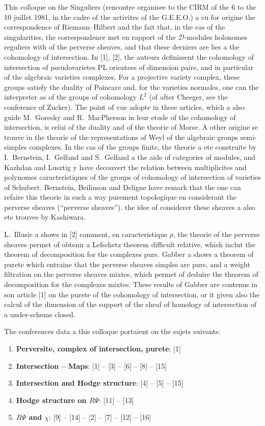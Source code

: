 \documentclass[12pt,a4paper]{article}
\theoremstyle{plain}
\theoremstyle{definition}
\theoremstyle{remark}
\newcommand{\cD}{\mathcal{D}}
\begin{document}
This colloque on the Singuliers (rencontre organisee to the CIRM of the 6 to the 10 juillet 1981, in the cadre of the activites of the G.E.E.O.) a eu for origine the correspondence of Riemann--Hilbert and the fait that, in the cas of the singularities, the correspondence met en rapport of the $\cD$-modules holonomes reguliers with of the perverse sheaves, and that these derniers are lies a the cohomology of intersection. In [1], [2], the auteurs definissent the cohomology of intersection of pseudovarietes PL orientees of dimension paire, and in particular of the algebraic varieties complexes. For a projective variety complex, these groups satisfy the duality of Poincare and, for the varieties normales, one can the interpreter as of the groups of cohomology $L^{2}$ (of after Cheeger, see the conference of Zucker). The point of vue adopte in these articles, which a also guide M.~Goresky and R.~MacPherson in leur etude of the cohomology of intersection, is celui of the duality and of the theorie of Morse. A other origine se trouve in the theorie of the representations of Weyl of the algebraic groups semi-simples complexes. In the cas of the groups finite, the theorie a ete construite by I.~Bernstein, I.~Gelfand and S.~Gelfand a the aide of categories of modules, and Kazhdan and Lusztig y have decouvert the relation between multiplicites and polynomes caracteristiques of the groups of cohomology of intersection of varieties of Schubert. Bernstein, Beilinson and Deligne have remark that the one can refaire this theorie in such a way purement topologique en considerant the perverse sheaves (``perverse sheaves''). the idee of considerer these sheaves a also ete trouvee by Kashiwara.

L.~Illusie a shows in [2] comment, en caracteristique $p$, the theorie of the perverse sheaves permet of obtenir a Lefschetz theorem difficult relative, which inclut the theorem of decomposition for the complexes purs. Gabber a shows a theorem of purete which entraine that the perverse sheaves simples are purs, and a weight filtration on the perverse sheaves mixtes, which permet of deduire the theorem of decomposition for the complexes mixtes. These results of Gabber are contenus in son article [1] on the purete of the cohomology of intersection, or it given also the calcul of the dimension of the support of the sheaf of homology of intersection of a under-scheme closed.

The conferences data a this colloque portaient on the sujets suivants:
\begin{enumerate}[label=\alph*)]
\item \textbf{Perversite, complex of intersection, purete}: [1]
\item \textbf{Intersection -- Maps}: [1] -- [3] -- [6] -- [8] -- [15]
\item \textbf{Intersection and Hodge structure}: [4] -- [5] -- [15]
\item \textbf{Hodge structure on $R\Psi$}: [11] -- [13]
\item \textbf{$R\Psi$ and $\chi$}: [9] -- [14] -- [2] -- [7] -- [12] -- [16]
\end{enumerate}
\end{document}
